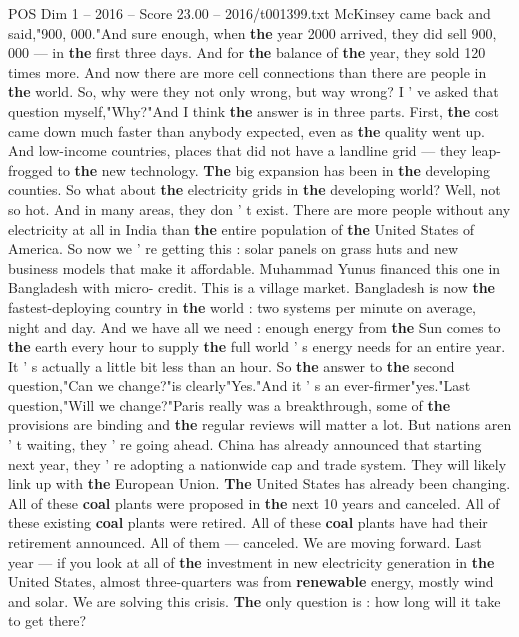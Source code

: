 \begin{textsample}{POS Dim 1 – 2016 – Score 23.00 – 2016/t001399.txt}
McKinsey came back and said,"900, 000."And sure enough, when \textbf{the} year 2000 arrived, they did sell 900, 000 — in \textbf{the} first three days.
And for \textbf{the} balance of \textbf{the} year, they sold 120 times more.
And now there are more cell connections than there are people in \textbf{the} world.
So, why were they not only wrong, but way wrong?
I ' ve asked that question myself,"Why?"And I think \textbf{the} answer is in three parts.
First, \textbf{the} cost came down much faster than anybody expected, even as \textbf{the} quality went up.
And low-income countries, places that did not have a landline grid — they leap-frogged to \textbf{the} new technology. \textbf{The} big expansion has been in \textbf{the} developing counties.
So what about \textbf{the} electricity grids in \textbf{the} developing world?
Well, not so hot.
And in many areas, they don ' t exist.
There are more people without any electricity at all in India than \textbf{the} entire population of \textbf{the} United States of America.
So now we ' re getting this : solar panels on grass huts and new business models that make it affordable.
Muhammad Yunus financed this one in Bangladesh with micro- credit.
This is a village market.
Bangladesh is now \textbf{the} fastest-deploying country in \textbf{the} world : two systems per minute on average, night and day.
And we have all we need : enough energy from \textbf{the} Sun comes to \textbf{the} earth every hour to supply \textbf{the} full world ' s energy needs for an entire year.
It ' s actually a little bit less than an hour.
So \textbf{the} answer to \textbf{the} second question,"Can we change?"is clearly"Yes."And it ' s an ever-firmer"yes."Last question,"Will we change?"Paris really was a breakthrough, some of \textbf{the} provisions are binding and \textbf{the} regular reviews will matter a lot.
But nations aren ' t waiting, they ' re going ahead.
China has already announced that starting next year, they ' re adopting a nationwide cap and trade system.
They will likely link up with \textbf{the} European Union. \textbf{The} United States has already been changing.
All of these \textbf{coal} plants were proposed in \textbf{the} next 10 years and canceled.
All of these existing \textbf{coal} plants were retired.
All of these \textbf{coal} plants have had their retirement announced.
All of them — canceled.
We are moving forward.
Last year — if you look at all of \textbf{the} investment in new electricity generation in \textbf{the} United States, almost three-quarters was from \textbf{renewable} energy, mostly wind and solar.
We are solving this crisis. \textbf{The} only question is : how long will it take to get there?

\end{textsample}
